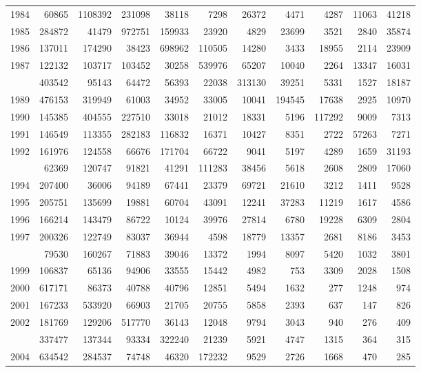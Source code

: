 \documentclass[
]{article}
\begin{document}
\begin{longtable}[t]{lrrrrrrrrrr}
1984 & 60865 & 1108392 & 231098 & 38118 & 7298 & 26372 & 4471 & 4287 & 11063 & 41218\\
1985 & 284872 & 41479 & 972751 & 159933 & 23920 & 4829 & 23699 & 3521 & 2840 & 35874\\
1986 & 137011 & 174290 & 38423 & 698962 & 110505 & 14280 & 3433 & 18955 & 2114 & 23909\\
1987 & 122132 & 103717 & 103452 & 30258 & 539976 & 65207 & 10040 & 2264 & 13347 & 16031\\
\addlinespace
1988 & 403542 & 95143 & 64472 & 56393 & 22038 & 313130 & 39251 & 5331 & 1527 & 18187\\
1989 & 476153 & 319949 & 61003 & 34952 & 33005 & 10041 & 194545 & 17638 & 2925 & 10970\\
1990 & 145385 & 404555 & 227510 & 33018 & 21012 & 18331 & 5196 & 117292 & 9009 & 7313\\
1991 & 146549 & 113355 & 282183 & 116832 & 16371 & 10427 & 8351 & 2722 & 57263 & 7271\\
1992 & 161976 & 124558 & 66676 & 171704 & 66722 & 9041 & 5197 & 4289 & 1659 & 31193\\
\addlinespace
1993 & 62369 & 120747 & 91821 & 41291 & 111283 & 38456 & 5618 & 2608 & 2809 & 17060\\
1994 & 207400 & 36006 & 94189 & 67441 & 23379 & 69721 & 21610 & 3212 & 1411 & 9528\\
1995 & 205751 & 135699 & 19881 & 60704 & 43091 & 12241 & 37283 & 11219 & 1617 & 4586\\
1996 & 166214 & 143479 & 86722 & 10124 & 39976 & 27814 & 6780 & 19228 & 6309 & 2804\\
1997 & 200326 & 122749 & 83037 & 36944 & 4598 & 18779 & 13357 & 2681 & 8186 & 3453\\
\addlinespace
1998 & 79530 & 160267 & 71883 & 39046 & 13372 & 1994 & 8097 & 5420 & 1032 & 3801\\
1999 & 106837 & 65136 & 94906 & 33555 & 15442 & 4982 & 753 & 3309 & 2028 & 1508\\
2000 & 617171 & 86373 & 40788 & 40796 & 12851 & 5494 & 1632 & 277 & 1248 & 974\\
2001 & 167233 & 533920 & 66903 & 21705 & 20755 & 5858 & 2393 & 637 & 147 & 826\\
2002 & 181769 & 129206 & 517770 & 36143 & 12048 & 9794 & 3043 & 940 & 276 & 409\\
\addlinespace
2003 & 337477 & 137344 & 93334 & 322240 & 21239 & 5921 & 4747 & 1315 & 364 & 315\\
2004 & 634542 & 284537 & 74748 & 46320 & 172232 & 9529 & 2726 & 1668 & 470 & 285\\

\end{longtable}
\end{document}
